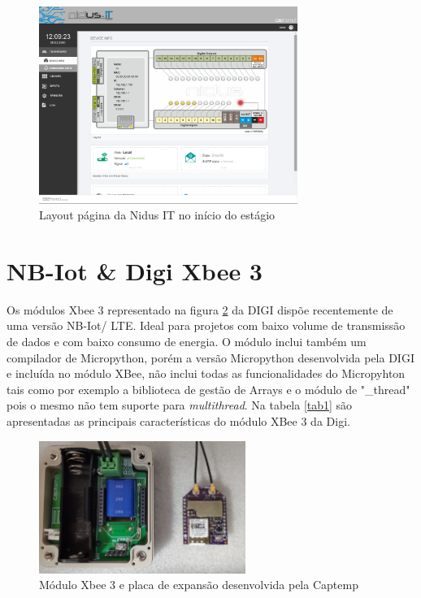 \begin{figure}[ht]
\centering
\includegraphics[width=0.75\textwidth]{images/layoutPAginaInit.png}
\caption{Layout página da Nidus IT no início do estágio}\label{fignidusPage}
\end{figure}


\section {NB-Iot \& Digi Xbee 3 }\label{nbiot}
\par
Os módulos Xbee 3 representado na figura \ref{figxbee} da DIGI dispõe recentemente de uma versão NB-Iot/ LTE. Ideal para projetos com baixo volume de transmissão de dados e com baixo consumo de energia. O módulo inclui também um compilador de Micropython, porém a versão Micropython desenvolvida pela DIGI e incluída no módulo XBee, não inclui todas as funcionalidades do Micropyhton tais como por exemplo a biblioteca de gestão de Arrays e o módulo de "\_thread" pois o mesmo não tem suporte para \textit{multithread}.
Na tabela \ref{tab1} são apresentadas as principais características do módulo XBee 3 da Digi\cite{Digixbee}.

\begin{figure}[ht]
\centering
\includegraphics[width=0.60\textwidth]{images/xbee.jpg}
\caption{Módulo Xbee 3 e placa de expansão desenvolvida pela Captemp}\label{figxbee}
\end{figure}

